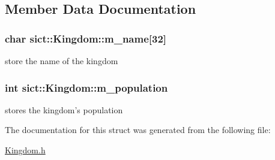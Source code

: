 \subsection{Member Data Documentation}
\hypertarget{structsict_1_1Kingdom_a1fb836a49142a18ae1dc8b114d7632ef}{
\subsubsection[{m\-\_\-name}]{\setlength{\rightskip}{0pt plus 5cm}char sict\-::\-Kingdom\-::m\-\_\-name\mbox{[}32\mbox{]}}}\label{structsict_1_1Kingdom_a1fb836a49142a18ae1dc8b114d7632ef}
store the name of the kingdom \hypertarget{structsict_1_1Kingdom_a78ddd5452f29a4f2df70574dd2d7799c}{
\subsubsection[{m\-\_\-population}]{\setlength{\rightskip}{0pt plus 5cm}int sict\-::\-Kingdom\-::m\-\_\-population}}\label{structsict_1_1Kingdom_a78ddd5452f29a4f2df70574dd2d7799c}
stores the kingdom's population 

The documentation for this struct was generated from the following file\-:\begin{DoxyCompactItemize}
\item 
\hyperlink{Kingdom_8h}{Kingdom.\-h}\end{DoxyCompactItemize}

